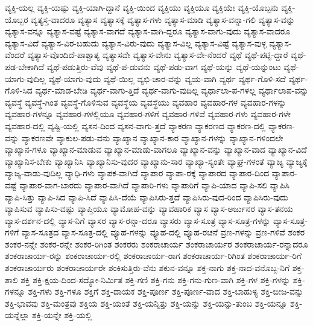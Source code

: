 {ವ್ಯಕ್ತಿ-ಯಲ್ಲ
ವ್ಯಕ್ತಿ-ಯಷ್ಟು
ವ್ಯಕ್ತಿ-ಯಾಗಿ-ದ್ದಾನೆ
ವ್ಯಕ್ತಿ-ಯಿಂದ
ವ್ಯಕ್ತಿಯು
ವ್ಯಕ್ತಿಯೂ
ವ್ಯಕ್ತಿಯೇ
ವ್ಯಕ್ತಿ-ಯೊಬ್ಬನು
ವ್ಯಕ್ತಿ-ಯೊಬ್ಬರ
ವ್ಯತ್ಯಸ್ತ-ವಾದರೂ
ವ್ಯತ್ಯಾಸ
ವ್ಯತ್ಯಾಸಕ್ಕೆ
ವ್ಯತ್ಯಾಸ-ಗಳು
ವ್ಯತ್ಯಾಸ-ಮಾಡಿ
ವ್ಯತ್ಯಾಸ-ವನ್ನಾ-ಗಲಿ
ವ್ಯತ್ಯಾಸ-ವನ್ನು
ವ್ಯತ್ಯಾಸ-ವನ್ನೂ
ವ್ಯತ್ಯಾಸ-ವಷ್ಟೆ
ವ್ಯತ್ಯಾಸ-ವಾಗದೆ
ವ್ಯತ್ಯಾಸ-ವಾಗಿ-ದ್ದರೂ
ವ್ಯತ್ಯಾಸ-ವಾಗು-ವುದು
ವ್ಯತ್ಯಾಸ-ವಾದರೂ
ವ್ಯತ್ಯಾಸ-ವಿದೆ
ವ್ಯತ್ಯಾಸ-ವಿರ-ಬಹುದು
ವ್ಯತ್ಯಾಸ-ವಿರು-ವುದು
ವ್ಯತ್ಯಾಸ-ವಿಲ್ಲ
ವ್ಯತ್ಯಾಸ-ವಿಷ್ಟೆ
ವ್ಯತ್ಯಾಸ-ವುಳ್ಳ
ವ್ಯತ್ಯಾಸ-ವೆಂದರೆ
ವ್ಯತ್ಯಾಸ-ವೊಂದಿದೆ-ಪಾಶ್ಚಾತ್ಯ
ವ್ಯತ್ಯಾಸವೇ
ವ್ಯತ್ಯಾಸ-ವೇನು
ವ್ಯತ್ಯಾಸ-ವೇ-ನೆಂದರೆ
ವ್ಯಥೆ
ವ್ಯಥೆ-ಪಟ್ಟಿ-ದ್ದಾರೆ
ವ್ಯಥೆ-ಪಡ-ಬೇಕಾಗಿದೆ
ವ್ಯಥೆ-ಪಡುತ್ತಿರು-ವೆವು
ವ್ಯಥೆ-ಪ-ಡುವನು
ವ್ಯಥೆ-ಪಡು-ವಾಗ
ವ್ಯಥೆ-ಯನ್ನು
ವ್ಯಥೆ-ಯನ್ನುಂಟು
ವ್ಯಥೆ-ಯಾಗು-ವುದಿಲ್ಲ
ವ್ಯಥೆ-ಯಾಗು-ವುದು
ವ್ಯಥೆ-ಯಿಲ್ಲ
ವ್ಯಭಿ-ಚಾರ-ವನ್ನು
ವ್ಯಯ-ವಾಗಿ
ವ್ಯರ್ಥ
ವ್ಯರ್ಥ-ಗೊಳಿ-ಸದೆ
ವ್ಯರ್ಥ-ಗೊಳಿ-ಸಿದ
ವ್ಯರ್ಥ-ಮಾಡ-ಬೇಡಿ
ವ್ಯರ್ಥ-ವಾಗು-ತ್ತಿದೆ
ವ್ಯರ್ಥ-ವಾಗು-ವುದಿಲ್ಲ
ವ್ಯರ್ಥಾಲಾ-ಪ-ಗಳಲ್ಲ
ವ್ಯರ್ಥಾಲಾಪ-ವನ್ನು
ವ್ಯವಸ್ಥೆ
ವ್ಯವಸ್ಥೆ-ಗಿಂತ
ವ್ಯವಸ್ಥೆ-ಗೊಳಿಸುವ
ವ್ಯವಸ್ಥೆಯ
ವ್ಯವಸ್ಥೆಯು
ವ್ಯವಹಾರ
ವ್ಯವಹಾರ-ಗಳ
ವ್ಯವಹಾರ-ಗಳನ್ನು
ವ್ಯವಹಾರ-ಗಳನ್ನೂ
ವ್ಯವಹಾರ-ಗಳಲ್ಲಿಯೂ
ವ್ಯವಹಾರ-ಗಳಿಗೆ
ವ್ಯವಹಾರ-ಗಳಿವೆ
ವ್ಯವಹಾರ-ಗಳು
ವ್ಯವಹಾರ-ಗಳೇ
ವ್ಯವಹಾರ-ದಲ್ಲಿ
ವ್ಯಷ್ಟಿ-ಯಲ್ಲಿ
ವ್ಯಸನ-ದಿಂದ
ವ್ಯಸನ-ವಾಗು-ತ್ತದೆ
ವ್ಯಾಕರಣ
ವ್ಯಾಕರಣದ
ವ್ಯಾಕರಣ-ದಲ್ಲಿ
ವ್ಯಾಕರಣ-ವನ್ನು
ವ್ಯಾಕರಣವೇ
ವ್ಯಾಕುಲ-ಪಡು-ವನು
ವ್ಯಾಖ್ಯಾನ
ವ್ಯಾಖ್ಯಾನ-ಕಾರ
ವ್ಯಾಖ್ಯಾನ-ಗಳನ್ನು
ವ್ಯಾಖ್ಯಾನ-ಗಳಿಂದಲೇ
ವ್ಯಾಖ್ಯಾನ-ಗಳೂ
ವ್ಯಾಖ್ಯಾನ-ಮಾಡುವ
ವ್ಯಾಖ್ಯಾನ-ಮಾಡು-ವಾಗಲೂ
ವ್ಯಾಖ್ಯಾನ-ವನ್ನು
ವ್ಯಾಖ್ಯಾನ-ವಾದ
ವ್ಯಾಖ್ಯಾನ-ವಿದೆ
ವ್ಯಾಖ್ಯಾನಿಸ-ಬೇಕು
ವ್ಯಾಖ್ಯಾನಿಸಿ
ವ್ಯಾಖ್ಯಾನಿಸು-ವುದರ
ವ್ಯಾಖ್ಯಾನು-ಸಾರ
ವ್ಯಾಖ್ಯಾ-ಸ್ಯಂತೇ
ವ್ಯಾಘ್ರ-ಗಳಂತೆ
ವ್ಯಾಜ್ಯ
ವ್ಯಾಜ್ಯಕ್ಕೆ
ವ್ಯಾಜ್ಯ-ವಾಡು-ವುದಿಲ್ಲ
ವ್ಯಾಧಿ-ಗಳು
ವ್ಯಾಪಕ-ವಾಗಿದೆ
ವ್ಯಾಪಾರ
ವ್ಯಾಪಾ-ರಕ್ಕೆ
ವ್ಯಾಪಾರದ
ವ್ಯಾಪಾರ-ದಿಂದ
ವ್ಯಾಪಾರ-ವಷ್ಟೆ
ವ್ಯಾಪಾರ-ವಾಗ-ಬಾರದು
ವ್ಯಾಪಾರ-ವಾಗಿದೆ
ವ್ಯಾಪಾರಿ-ಗಳು
ವ್ಯಾಪಾರಿಗೆ
ವ್ಯಾಪಿ-ಯಾದ
ವ್ಯಾಪಿ-ಸಲಿ
ವ್ಯಾಪಿಸಿ
ವ್ಯಾಪಿ-ಸಿತ್ತು
ವ್ಯಾಪಿ-ಸಿದ
ವ್ಯಾಪಿ-ಸಿದೆ
ವ್ಯಾಪಿಸಿ-ದೆಯೆ
ವ್ಯಾಪಿಸಿರು-ತ್ತದೆ
ವ್ಯಾಪಿಸಿರು-ವುದ-ರಿಂದ
ವ್ಯಾಪಿಸಿರು-ವುದು
ವ್ಯಾಪಿಸುವ
ವ್ಯಾಪಿಸು-ವಷ್ಟು
ವ್ಯಾಪ್ತಿಯೂ
ವ್ಯಾಮೋಹ-ವನ್ನು
ವ್ಯಾವಹಾರಿಕ
ವ್ಯಾಸ
ವ್ಯಾಸ-ಅರ್ಜುನರ
ವ್ಯಾಸ-ತನಯ
ವ್ಯಾಸ-ದರ್ಶನ-ದಲ್ಲಿ
ವ್ಯಾಸ-ನಿಗೆ
ವ್ಯಾಸರ
ವ್ಯಾಸ-ರನ್ನಾ-ದರೂ
ವ್ಯಾಸರು
ವ್ಯಾಸ-ಸೂತ್ರ
ವ್ಯಾಸ-ಸೂತ್ರ-ಗಳನ್ನು
ವ್ಯಾಸ-ಸೂತ್ರ-ಗಳಿಗೆ
ವ್ಯಾಸ-ಸೂತ್ರದ
ವ್ಯಾಸ-ಸೂತ್ರ-ದಲ್ಲಿ
ವ್ಯೂಹ-ಗಳನ್ನು
ವ್ಯೂಹ-ದಲ್ಲಿ
ವ್ಯೂಹ-ರಚನೆ
ವ್ರಣ-ಗಳನ್ನು
ವ್ರಣ-ಗಳಿವೆ
ಶಂಕರ
ಶಂಕರ-ನನ್ನೇ
ಶಂಕರ-ರನ್ನೇ
ಶಂಕರ-ರಿಗಿಂತ
ಶಂಕರರು
ಶಂಕರಾಚಾರ್ಯ
ಶಂಕರಾಚಾರ್ಯರ
ಶಂಕರಾಚಾರ್ಯ-ರನ್ನಾದರೂ
ಶಂಕರಾಚಾರ್ಯ-ರನ್ನು
ಶಂಕರಾಚಾರ್ಯ-ರಲ್ಲಿ
ಶಂಕರಾಚಾರ್ಯ-ರಾಗ
ಶಂಕರಾಚಾರ್ಯ-ರಿಗಿಂತ
ಶಂಕರಾಚಾರ್ಯ-ರಿಗೆ
ಶಂಕರಾಚಾರ್ಯರು
ಶಂಕರಾಚಾರ್ಯರೇ
ಶಂಕಿಸುತ್ತಿರು-ವೆನು
ಶಕುನ-ವನ್ನೂ
ಶಕ್ತ-ನಾಗು
ಶಕ್ತ-ನಾದ-ವನೊಬ್ಬ-ನಿಗೆ
ಶಕ್ತ-ಶಾಲಿ
ಶಕ್ತಿ
ಶಕ್ತಿ-ಕ್ಷಯ-ದಿಂದ-ಸದ್ಯೋ-ನಿರ್ಮಿತ
ಶಕ್ತಿ-ಗಣಿ
ಶಕ್ತಿ-ಗನು
ಶಕ್ತಿ-ಗನು-ಗುಣ-ವಾಗಿ
ಶಕ್ತಿ-ಗಳ
ಶಕ್ತಿ-ಗಳನ್ನು
ಶಕ್ತಿ-ಗಳನ್ನೂ
ಶಕ್ತಿ-ಗಳು
ಶಕ್ತಿ-ಗಳೂ
ಶಕ್ತಿಗೆ
ಶಕ್ತಿ-ದಾಯಕ
ಶಕ್ತಿ-ಪೂರ್ಣ
ಶಕ್ತಿ-ಪೂರ್ಣ-ವಾದ
ಶಕ್ತಿ-ಬಾಹುಳ್ಯ
ಶಕ್ತಿ-ಬೀಜ-ವನ್ನು
ಶಕ್ತಿ-ಭಾವವು
ಶಕ್ತಿ-ಮಂತ್ರವು
ಶಕ್ತಿಯ
ಶಕ್ತಿ-ಯಂತೆ
ಶಕ್ತಿ-ಯನ್ನಿತ್ತು
ಶಕ್ತಿ-ಯನ್ನು
ಶಕ್ತಿ-ಯನ್ನು-ತುಂಬ
ಶಕ್ತಿ-ಯನ್ನೂ
ಶಕ್ತಿ-ಯನ್ನೆಲ್ಲಾ
ಶಕ್ತಿ-ಯನ್ನೇ
ಶಕ್ತಿ-ಯಲ್ಲಿ
}
